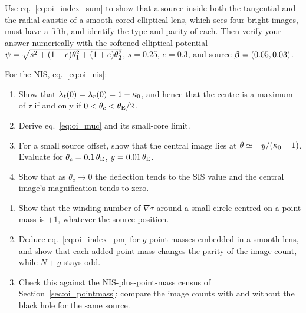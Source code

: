\begin{exercise}
\label{ex:oi_five_images}
Use eq.~\eqref{eq:oi_index_sum} to show that a source inside both the
tangential and the radial caustic of a smooth cored elliptical lens,
which sees four bright images, must have a fifth, and identify the type
and parity of each.  Then verify your answer numerically with the
softened elliptical potential
$\psi=\sqrt{s^2+(1-e)\theta_1^2+(1+e)\theta_2^2}$, $s=0.25$, $e=0.3$,
and source $\boldsymbol{\beta}=(0.05,0.03)$.
\end{exercise}

\begin{exercise}
\label{ex:oi_nis_central}
For the NIS, eq.~\eqref{eq:oi_nis}:
\begin{enumerate}[label=(\alph*)]
    \item Show that $\lambda_t(0)=\lambda_r(0)=1-\kappa_0$, and hence
          that the centre is a maximum of $\tau$ if and only if
          $0<\theta_c<\theta_{\mathrm{E}}/2$.
    \item Derive eq.~\eqref{eq:oi_muc} and its small-core limit.
    \item For a small source offset, show that the central image lies at
          $\theta\simeq-y/(\kappa_0-1)$.  Evaluate for
          $\theta_c=0.1\,\theta_{\mathrm{E}}$, $y=0.01\,\theta_{\mathrm{E}}$.
    \item Show that as $\theta_c\to0$ the deflection tends to the SIS
          value and the central image's magnification tends to zero.
\end{enumerate}
\end{exercise}

\begin{exercise}
\label{ex:oi_puncture}
\begin{enumerate}[label=(\alph*)]
    \item Show that the winding number of $\nabla\tau$ around a small
          circle centred on a point mass is $+1$, whatever the source
          position.
    \item Deduce eq.~\eqref{eq:oi_index_pm} for $g$ point masses
          embedded in a smooth lens, and show that each added point mass
          changes the parity of the image count, while $N+g$ stays odd.
    \item Check this against the NIS-plus-point-mass census of
          Section~\ref{sec:oi_pointmass}: compare the image counts with
          and without the black hole for the same source.
\end{enumerate}
\end{exercise}

